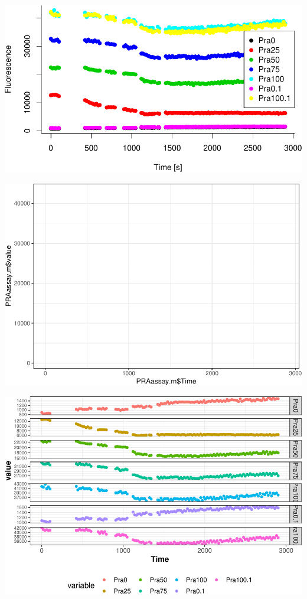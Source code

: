 \documentclass[12pt,twoside]{reedthesis}
\begin{document}
  \begin{center}\includegraphics{tesis_files/figure-latex/Cinetics-4} \end{center}
  
  \begin{center}\includegraphics{tesis_files/figure-latex/Cinetics-5} \end{center}
  
  \begin{center}\includegraphics{tesis_files/figure-latex/Cinetics-6} \end{center}
  
\end{document}
